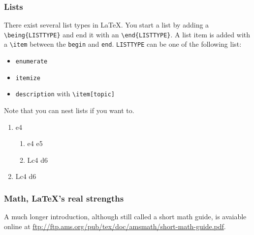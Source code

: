 \documentclass[10pt,a4paper]{scrartcl}
\begin{document}
\subsubsection{Lists}
There exist several list types in \LaTeX. You start a list by adding a 
\verb$\being{LISTTYPE}$ and end it with an \verb$\end{LISTTYPE}$. A list item
is added with a \verb$\item$ between the \texttt{begin} and \texttt{end}.
\texttt{LISTTYPE} can be one of the following list:
\begin{itemize}
	\item \texttt{enumerate}
	\item \texttt{itemize}
	\item \texttt{description} with \verb$\item[topic]$
\end{itemize}
\noindent Note that you can nest lists if you want to.
\begin{enumerate}
	\item{e4} 	
		\begin{enumerate}
			\item{e4}   e5
			\item Lc4 d6
		\end{enumerate}
	\item Lc4 d6
\end{enumerate}


\subsubsection{Math, \LaTeX 's real strengths}
A much longer introduction, although still called a short math guide, is 
avaiable online at \url{ftp://ftp.ams.org/pub/tex/doc/amsmath/short-math-guide.pdf}.
\end{document}
